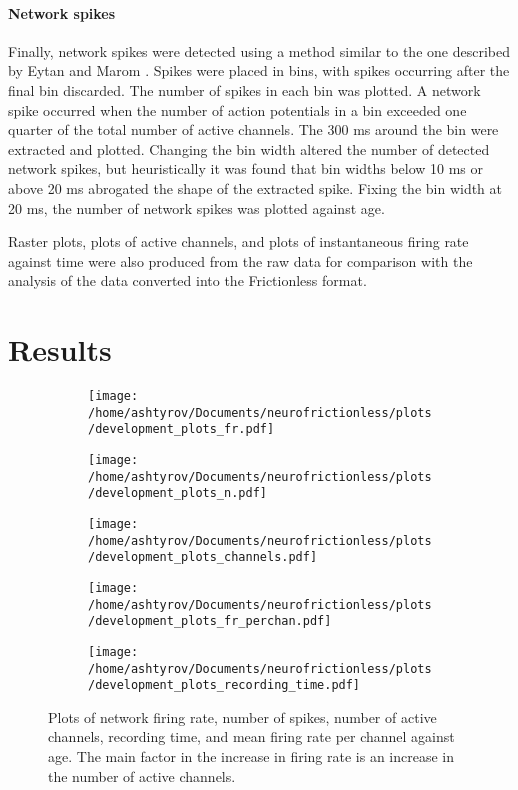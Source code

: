 \documentclass[10pt]{article}
\begin{document}
\paragraph{Network spikes} Finally, network spikes were detected using a method similar to the one described by Eytan and Marom \cite{eytan_dynamics_2006}. Spikes were placed in bins, with spikes occurring after the final bin discarded. The number of spikes in each bin was plotted. A network spike occurred when the number of action potentials in a bin exceeded one quarter of the total number of active channels. The 300 ms around the bin were extracted and plotted. Changing the bin width altered the number of detected network spikes, but heuristically it was found that bin widths below 10 ms or above 20 ms abrogated the shape of the extracted spike. Fixing the bin width at 20 ms, the number of network spikes was plotted against age.

\par Raster plots, plots of active channels, and plots of instantaneous firing rate against time were also produced from the raw data for comparison with the analysis of the data converted into the Frictionless format.

\section{Results}

\begin{figure}
	\centering
\begin{subfigure}[b]{0.45\textwidth}
	\centering
	\texttt{[image: /home/ashtyrov/Documents/neurofrictionless/plots/development\_plots\_fr.pdf]}
\end{subfigure}
\hfill
\begin{subfigure}[b]{0.45\textwidth}
	\centering
	\texttt{[image: /home/ashtyrov/Documents/neurofrictionless/plots/development\_plots\_n.pdf]}
\end{subfigure}

\begin{subfigure}[b]{0.45\textwidth}
	\centering
	\texttt{[image: /home/ashtyrov/Documents/neurofrictionless/plots/development\_plots\_channels.pdf]}
\end{subfigure}
\hfill
\begin{subfigure}[b]{0.45\textwidth}
	\centering
	\texttt{[image: /home/ashtyrov/Documents/neurofrictionless/plots/development\_plots\_fr\_perchan.pdf]}
\end{subfigure}

\begin{subfigure}[b]{0.45\textwidth}
	\centering
	\texttt{[image: /home/ashtyrov/Documents/neurofrictionless/plots/development\_plots\_recording\_time.pdf]}
\end{subfigure}

	\caption{Plots of network firing rate, number of spikes, number of active channels, recording time, and mean firing rate per channel against age. The main factor in the increase in firing rate is an increase in the number of active channels.}
	\label{fig:development}
\end{figure}
\end{document}
